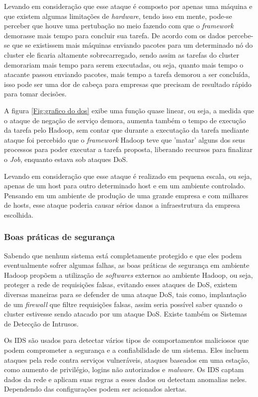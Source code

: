 Levando em consideração que esse ataque é composto por apenas uma máquina e que existem algumas limitações de \textit{hardware}, tendo isso em mente, pode-se perceber que houve uma pertubação no meio fazendo com que o \textit{framework} demorasse mais tempo para concluir sua tarefa. De acordo com os dados percebe-se que se existissem mais máquinas enviando pacotes para um determinado nó do cluster ele ficaria altamente sobrecarregado, sendo assim as tarefas do cluster demorariam mais tempo para serem executadas, ou seja, quanto mais tempo o atacante passou enviando pacotes, mais tempo a tarefa demorou a ser concluída, isso pode ser uma dor de cabeça para empresas que precisam de resultado rápido para tomar decisões.

A figura \ref{Fig:grafico do dos} exibe uma função quase linear, ou seja, a medida que o ataque de negação de serviço demora, aumenta também o tempo de execução da tarefa pelo Hadoop, sem contar que durante a executação da tarefa mediante ataque foi percebido que o \textit{framework} Hadoop teve que 'matar' alguns dos seus processos para poder executar a tarefa proposta, liberando recursos para finalizar o \textit{Job}, enquanto estava sob ataques DoS.

Levando em consideração que esse ataque é realizado em pequena escala, ou seja, apenas de um host para outro determinado host e em um ambiente controlado. Pensando em um ambiente de produção de uma grande empresa e com milhares de hosts, esse ataque poderia causar sérios danos a infraestrutura da empresa escolhida.

\subsubsection{Boas práticas de segurança}

Sabendo que nenhum sistema está completamente protegido e que eles podem eventualmente sofrer algumas falhas, as boas práticas de segurança em ambiente Hadoop propõem a utilização de \textit{softwares} externos ao ambiente Hadoop, ou seja, proteger a rede de requisições falsas, evitando esses ataques de DoS, existem diversas maneiras para se defender de uma ataque DoS, tais como, implantação de um \textit{firewall} que filtre requisições falsas, assim seria possível saber quando o cluster estivesse sendo atacado por um ataque DoS. Existe também os Sistemas de Detecção de Intrusos.

Os IDS são usados para detectar vários tipos de comportamentos maliciosos que podem comprometer a segurança e a confiabilidade de um sistema. Eles incluem ataques pela rede contra serviços vulneráveis, ataques baseados em uma estação, como aumento de privilégio, logins não autorizados e \textit{malware}. Os IDS captam dados da rede e aplicam suas regras a esses dados ou detectam anomalias neles. Dependendo das configurações podem ser acionados alertas.




